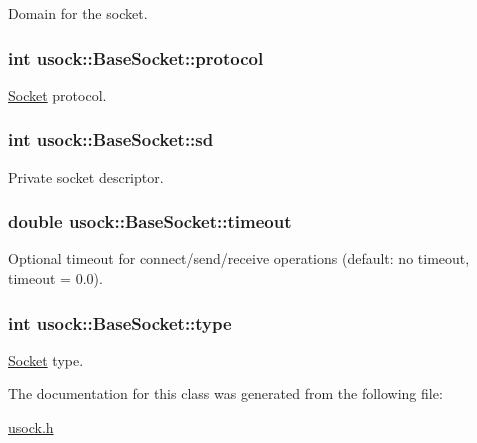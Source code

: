 Domain for the socket. 

\hypertarget{classusock_1_1BaseSocket_91b9f72f183b6314891f7e1f93ead99a}{
\subsubsection[{protocol}]{\setlength{\rightskip}{0pt plus 5cm}int {\bf usock::BaseSocket::protocol}}}
\label{classusock_1_1BaseSocket_91b9f72f183b6314891f7e1f93ead99a}


\hyperlink{classusock_1_1Socket}{Socket} protocol. 

\hypertarget{classusock_1_1BaseSocket_63b6c07fb14f937056148cbf8b3531c5}{
\subsubsection[{sd}]{\setlength{\rightskip}{0pt plus 5cm}int {\bf usock::BaseSocket::sd}}}
\label{classusock_1_1BaseSocket_63b6c07fb14f937056148cbf8b3531c5}


Private socket descriptor. 

\hypertarget{classusock_1_1BaseSocket_b419e8fd0b849c74b73a02d6bd9081e3}{
\subsubsection[{timeout}]{\setlength{\rightskip}{0pt plus 5cm}double {\bf usock::BaseSocket::timeout}}}
\label{classusock_1_1BaseSocket_b419e8fd0b849c74b73a02d6bd9081e3}


Optional timeout for connect/send/receive operations (default: no timeout, timeout = 0.0). 

\hypertarget{classusock_1_1BaseSocket_139a74d163977332762f349a73f4bd64}{
\subsubsection[{type}]{\setlength{\rightskip}{0pt plus 5cm}int {\bf usock::BaseSocket::type}}}
\label{classusock_1_1BaseSocket_139a74d163977332762f349a73f4bd64}


\hyperlink{classusock_1_1Socket}{Socket} type. 



The documentation for this class was generated from the following file:\begin{CompactItemize}
\item 
\hyperlink{usock_8h}{usock.h}\end{CompactItemize}
